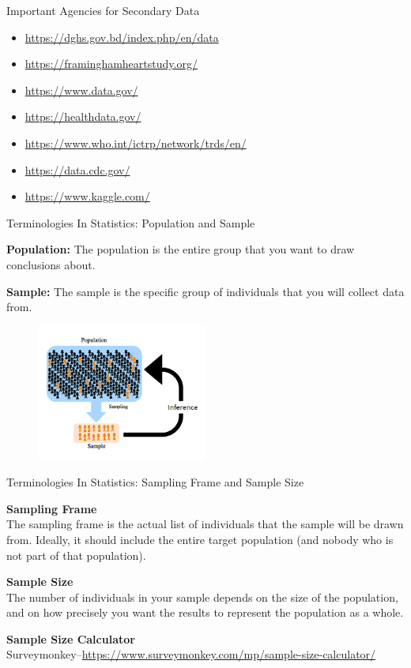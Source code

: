 \begin{frame}[t]{Important Agencies for Secondary Data}
\begin{itemize}
	\item \url{https://dghs.gov.bd/index.php/en/data}
	\item \url{https://framinghamheartstudy.org/}
	\item \url{https://www.data.gov/}
	\item \url{https://healthdata.gov/}
	\item \url{https://www.who.int/ictrp/network/trds/en/}
	\item \url{https://data.cdc.gov/}
	\item \url{https://www.kaggle.com/}
\end{itemize}
\end{frame}


\begin{frame}[t]{Terminologies In Statistics: Population and Sample}

	\textbf{Population:} The population is the entire group that you want to 
	draw conclusions about.

	\textbf{Sample:} The sample is the specific group of individuals that you 
	will collect data from.

	\begin{figure} [ht]
		\centering
		\includegraphics[width=0.5\textwidth]{stats_img/population_sample.png}
	\end{figure}
\end{frame}


\begin{frame}[t]{Terminologies In Statistics: Sampling Frame and Sample Size}
	
	\textbf{Sampling Frame} \\ 
	The sampling frame is the actual list of 
	individuals that the sample will be drawn from. Ideally, it should include 
	the entire target population (and nobody who is not part of that 
	population).
	
	\textbf{Sample Size} \\ 
	The number of individuals in your sample depends on 
	the size of the population, and on how precisely you want the results to 
	represent the population as a whole.
	
	
	\textbf{Sample Size Calculator} \\
	Surveymonkey--\url{https://www.surveymonkey.com/mp/sample-size-calculator/}
	
\end{frame}



